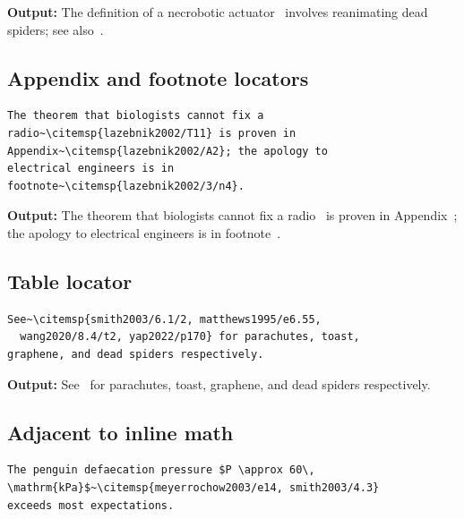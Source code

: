 \documentclass[11pt, a4paper]{article}
\begin{document}
\noindent\textbf{Output:} The definition of a necrobotic
actuator~ involves reanimating dead
spiders; see also~.


\subsection{Appendix and footnote locators}

\begin{tcolorbox}[colback=blue!3, colframe=blue!30, boxrule=0.5pt, arc=2pt,
  top=6pt, bottom=6pt, left=10pt, right=10pt]
\begin{verbatim}
The theorem that biologists cannot fix a
radio~\citemsp{lazebnik2002/T11} is proven in
Appendix~\citemsp{lazebnik2002/A2}; the apology to
electrical engineers is in
footnote~\citemsp{lazebnik2002/3/n4}.
\end{verbatim}
\end{tcolorbox}

\noindent\textbf{Output:} The theorem that biologists cannot fix a
radio~ is proven in
Appendix~; the apology to electrical engineers
is in footnote~.


\subsection{Table locator}

\begin{tcolorbox}[colback=blue!3, colframe=blue!30, boxrule=0.5pt, arc=2pt,
  top=6pt, bottom=6pt, left=10pt, right=10pt]
\begin{verbatim}
See~\citemsp{smith2003/6.1/2, matthews1995/e6.55,
  wang2020/8.4/t2, yap2022/p170} for parachutes, toast,
graphene, and dead spiders respectively.
\end{verbatim}
\end{tcolorbox}

\noindent\textbf{Output:}
See~ for parachutes, toast, graphene, and dead spiders
respectively.


\subsection{Adjacent to inline math}

\begin{tcolorbox}[colback=blue!3, colframe=blue!30, boxrule=0.5pt, arc=2pt,
  top=6pt, bottom=6pt, left=10pt, right=10pt]
\begin{verbatim}
The penguin defaecation pressure $P \approx 60\,
\mathrm{kPa}$~\citemsp{meyerrochow2003/e14, smith2003/4.3}
exceeds most expectations.
\end{verbatim}
\end{tcolorbox}
\end{document}
